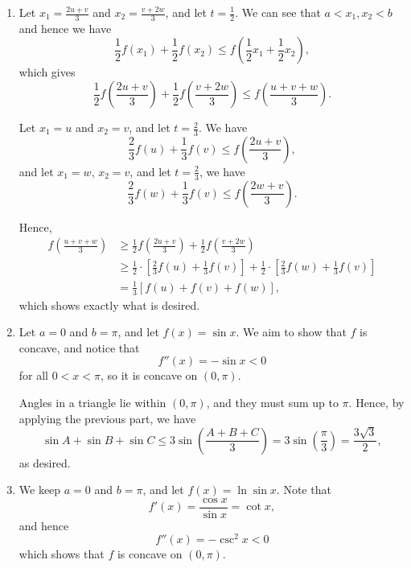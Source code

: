 \begin{enumerate}
    \item Let \(x_1 = \frac{2u + v}{3}\) and \(x_2 = \frac{v + 2w}{3}\), and let \(t = \frac{1}{2}\). We can see that \(a < x_1, x_2 < b\) and hence we have
          \[
              \frac{1}{2} f(x_1) + \frac{1}{2} f(x_2) \leq f\left(\frac{1}{2} x_1 + \frac{1}{2} x_2\right),
          \]
          which gives
          \[
              \frac{1}{2} f\left(\frac{2u + v}{3}\right) + \frac{1}{2} f\left(\frac{v + 2w}{3}\right) \leq f\left(\frac{u + v + w}{3}\right).
          \]

          Let \(x_1 = u\) and \(x_2 = v\), and let \(t = \frac{2}{3}\). We have
          \[
              \frac{2}{3} f(u) + \frac{1}{3} f(v) \leq f\left(\frac{2u + v}{3}\right),
          \]
          and let \(x_1 = w\), \(x_2 = v\), and let \(t = \frac{2}{3}\), we have
          \[
              \frac{2}{3} f(w) + \frac{1}{3} f(v) \leq f\left(\frac{2w + v}{3}\right).
          \]

          Hence,
          \begin{align*}
              f\left(\frac{u + v + w}{3}\right) & \geq \frac{1}{2} f\left(\frac{2u + v}{3}\right) + \frac{1}{2} f\left(\frac{v + 2w}{3}\right)                                                 \\
                                                & \geq \frac{1}{2} \cdot \left[\frac{2}{3} f(u) + \frac{1}{3} f(v)\right] + \frac{1}{2} \cdot \left[\frac{2}{3} f(w) + \frac{1}{3} f(v)\right] \\
                                                & = \frac{1}{3} \left[f(u) + f(v) + f(w)\right],
          \end{align*}
          which shows exactly what is desired.

    \item Let \(a = 0\) and \(b = \pi\), and let \(f(x) = \sin x\). We aim to show that \(f\) is concave, and notice that
          \[
              f''(x) = - \sin x < 0
          \]
          for all \(0 < x < \pi\), so it is concave on \((0, \pi)\).

          Angles in a triangle lie within \((0, \pi)\), and they must sum up to \(\pi\). Hence, by applying the previous part, we have
          \[
              \sin A + \sin B + \sin C \leq 3\sin \left(\frac{A + B + C}{3}\right) = 3\sin \left(\frac{\pi}{3}\right) = \frac{3 \sqrt{3}}{2},
          \]
          as desired.

    \item We keep \(a = 0\) and \(b = \pi\), and let \(f(x) = \ln \sin x\). Note that
          \[
              f'(x) = \frac{\cos x}{\sin x} = \cot x,
          \]
          and hence
          \[
              f''(x) = - \csc^2 x < 0
          \]
          which shows that \(f\) is concave on \((0, \pi)\).


\end{enumerate}
